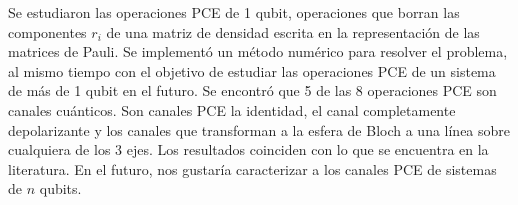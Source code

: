 Se estudiaron las operaciones PCE de 1 qubit, operaciones 
que borran las componentes $r_i$ de una matriz de densidad 
escrita en la representación de las matrices de Pauli. 
Se implementó un método numérico para resolver el problema, 
al mismo tiempo con el objetivo de estudiar las operaciones PCE 
de un sistema de más de 1 qubit en el futuro.
Se encontró que 5 de las 8 operaciones PCE son canales cuánticos.
Son canales PCE la identidad, el canal completamente depolarizante 
y los canales que transforman a la esfera de Bloch a una línea sobre 
cualquiera de los 3 ejes. Los resultados coinciden con lo que se
encuentra en la literatura. En el futuro, nos gustaría 
caracterizar a los canales PCE de sistemas de $n$ qubits.



